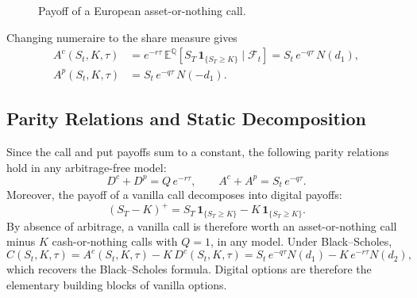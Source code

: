 \documentclass[11pt,a4paper]{article}
\theoremstyle{remark}
\newcommand{\ind}{\mathbf{1}}
\begin{document}
\begin{figure}[htbp]
\centering
{}
\caption{Payoff of a European asset-or-nothing call.}
\label{fig:payoff-aon}
\end{figure}

Changing numeraire to the share measure gives
\begin{align}
  A^{c}(S_t,K,\tau) &= e^{-r\tau}\,\mathbb{E}^{\mathbb{Q}}\!\left[S_T\,\mathbf{1}_{\{S_T \geq K\}} \mid \mathcal{F}_t\right]
                     = S_t\,e^{-q\tau}\,N(d_1), \label{eq:asset-call}\\
  A^{p}(S_t,K,\tau) &= S_t\,e^{-q\tau}\,N(-d_1). \label{eq:asset-put}
\end{align}

\subsection{Parity Relations and Static Decomposition}

Since the call and put payoffs sum to a constant, the following parity
relations hold in any arbitrage-free model:
\begin{equation}
  D^{c} + D^{p} = Q\,e^{-r\tau},
  \qquad
  A^{c} + A^{p} = S_t\,e^{-q\tau}.
  \label{eq:digital-parity}
\end{equation}
Moreover, the payoff of a vanilla call decomposes into digital payoffs:
\begin{equation}
  (S_T - K)^+ = S_T\,\ind_{\{S_T \geq K\}} - K\,\ind_{\{S_T \geq K\}}.
\end{equation}
By absence of arbitrage, a vanilla call is therefore worth an asset-or-nothing
call minus $K$ cash-or-nothing calls with $Q=1$, in any model. Under
Black--Scholes,
\begin{equation}
  C(S_t,K,\tau) = A^{c}(S_t,K,\tau) - K\,D^{c}(S_t,K,\tau)
               = S_t\,e^{-q\tau}N(d_1) - K\,e^{-r\tau}N(d_2),
  \label{eq:vanilla-decomposition}
\end{equation}
which recovers the Black--Scholes formula. Digital options are therefore the
elementary building blocks of vanilla options.
\end{document}
